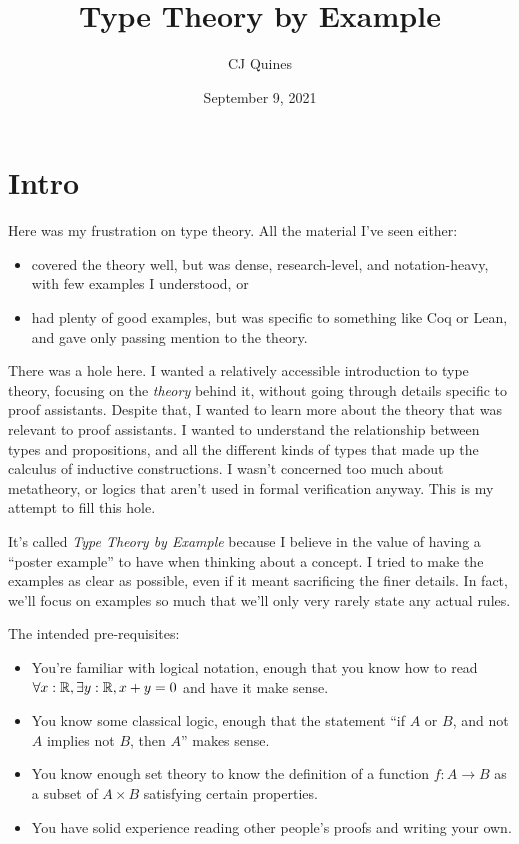 \documentclass[11pt,paper=letter]{scrartcl}
\begin{document}
\title{Type Theory by Example}
\author{CJ Quines}
\date{September 9, 2021}

\maketitle

\tableofcontents

\clearpage

\section{Intro}

Here was my frustration on type theory. All the material I've seen either:
\begin{itemize}
\item covered the theory well, but was dense, research-level, and notation-heavy, with few examples I understood, or
\item had plenty of good examples, but was specific to something like Coq or Lean, and gave only passing mention to the theory.
\end{itemize}
There was a hole here. I wanted a relatively accessible introduction to type theory, focusing on the \emph{theory} behind it, without going through details specific to proof assistants. Despite that, I wanted to learn more about the theory that was relevant to proof assistants. I wanted to understand the relationship between types and propositions, and all the different kinds of types that made up the calculus of inductive constructions. I wasn't concerned too much about metatheory, or logics that aren't used in formal verification anyway. This is my attempt to fill this hole.

It's called \emph{Type Theory by Example} because I believe in the value of having a ``poster example'' to have when thinking about a concept. I tried to make the examples as clear as possible, even if it meant sacrificing the finer details. In fact, we'll focus on examples so much that we'll only very rarely state any actual rules.

The intended pre-requisites:

\begin{itemize}
\item You're familiar with logical notation, enough that you know how to read $\forall x: \mathbb R, \exists y: \mathbb R, x + y = 0$ and have it make sense.

\item You know some classical logic, enough that the statement ``if $A$ or $B$, and not $A$ implies not $B$, then $A$'' makes sense.

\item You know enough set theory to know the definition of a function $f : A \to B$ as a subset of $A \times B$ satisfying certain properties.

\item You have solid experience reading other people's proofs and writing your own.
\end{itemize}
\end{document}
